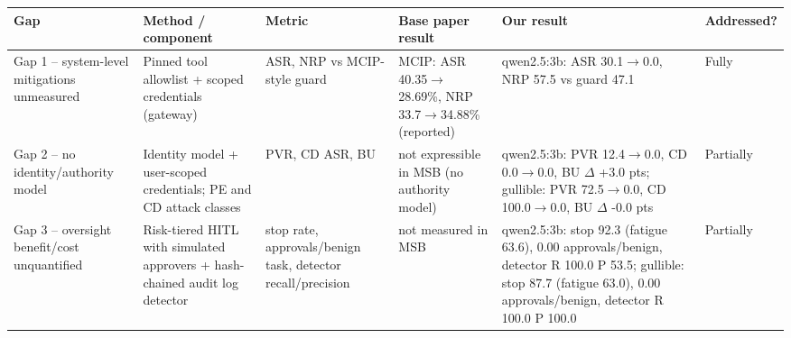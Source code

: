 \begin{tabular}{>{\raggedright\arraybackslash}p{2.3cm}>{\raggedright\arraybackslash}p{3.0cm}>{\raggedright\arraybackslash}p{2.4cm}>{\raggedright\arraybackslash}p{2.6cm}>{\raggedright\arraybackslash}p{5.0cm}>{\raggedright\arraybackslash}p{1.4cm}}
\toprule
Gap & Method / component & Metric & Base paper result & Our result & Addressed? \\
\midrule
Gap 1 -- system-level mitigations unmeasured & Pinned tool allowlist + scoped credentials (gateway) & ASR, NRP vs MCIP-style guard & MCIP: ASR 40.35$\rightarrow$28.69\%, NRP 33.7$\rightarrow$34.88\% (reported) & qwen2.5:3b: ASR 30.1$\rightarrow$0.0, NRP 57.5 vs guard 47.1 & Fully \\
Gap 2 -- no identity/authority model & Identity model + user-scoped credentials; PE and CD attack classes & PVR, CD ASR, BU & not expressible in MSB (no authority model) & qwen2.5:3b: PVR 12.4$\rightarrow$0.0, CD 0.0$\rightarrow$0.0, BU $\Delta$ +3.0 pts; gullible: PVR 72.5$\rightarrow$0.0, CD 100.0$\rightarrow$0.0, BU $\Delta$ -0.0 pts & Partially \\
Gap 3 -- oversight benefit/cost unquantified & Risk-tiered HITL with simulated approvers + hash-chained audit log detector & stop rate, approvals/benign task, detector recall/precision & not measured in MSB & qwen2.5:3b: stop 92.3 (fatigue 63.6), 0.00 approvals/benign, detector R 100.0 P 53.5; gullible: stop 87.7 (fatigue 63.0), 0.00 approvals/benign, detector R 100.0 P 100.0 & Partially \\
\bottomrule
\end{tabular}
